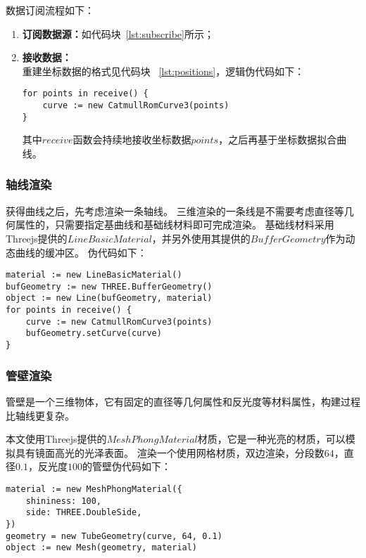 数据订阅流程如下：

\begin{enumerate}
\item \textbf{订阅数据源：}如代码块~\ref{lst:subscribe}所示；
\item \textbf{接收数据：} \\
重建坐标数据的格式见代码块 ~\ref{lst:positions}，逻辑伪代码如下：

\begin{lstlisting}[caption={订阅数据}]
for points in receive() {
    curve := new CatmullRomCurve3(points)
}
\end{lstlisting}

其中$receive$函数会持续地接收坐标数据$points$，之后再基于坐标数据拟合曲线。

\end{enumerate}

\subsubsection{轴线渲染}

获得曲线之后，先考虑渲染一条轴线。
三维渲染的一条线是不需要考虑直径等几何属性的，只需要指定基曲线和基础线材料即可完成渲染。
基础线材料采用Threejs提供的$LineBasicMaterial$，并另外使用其提供的$BufferGeometry$作为动态曲线的缓冲区。
伪代码如下：

\begin{lstlisting}[caption={渲染轴线}]
material := new LineBasicMaterial()
bufGeometry := new THREE.BufferGeometry()
object := new Line(bufGeometry, material)
for points in receive() {
    curve := new CatmullRomCurve3(points)
    bufGeometry.setCurve(curve)
}
\end{lstlisting}

\subsubsection{管壁渲染}

管壁是一个三维物体，它有固定的直径等几何属性和反光度等材料属性，构建过程比轴线更复杂。

本文使用Threejs提供的$MeshPhongMaterial$材质，它是一种光亮的材质，可以模拟具有镜面高光的光泽表面。
渲染一个使用网格材质，双边渲染，分段数$64$，直径$0.1$，反光度$100$的管壁伪代码如下：

\begin{lstlisting}[caption={渲染管壁}]
material := new MeshPhongMaterial({
    shininess: 100,
    side: THREE.DoubleSide,
})
geometry = new TubeGeometry(curve, 64, 0.1)
object := new Mesh(geometry, material)
\end{lstlisting}

